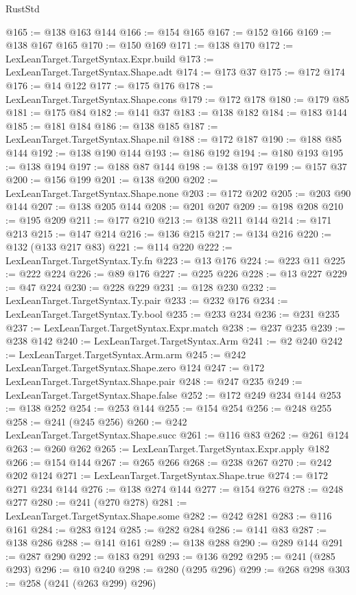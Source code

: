 \begin{lexlean}{RustStd}
\begin{coremodule}
@165 := @138 @163 @144
@166 := @154 @165
@167 := @152 @166
@169 := @138 @167 @165
@170 := @150 @169
@171 := @138 @170
@172 := LexLeanTarget.TargetSyntax.Expr.build
@173 := LexLeanTarget.TargetSyntax.Shape.adt
@174 := @173 @37
@175 := @172 @174
@176 := @14 @122
@177 := @175 @176
@178 := LexLeanTarget.TargetSyntax.Shape.cons
@179 := @172 @178
@180 := @179 @85
@181 := @175 @84
@182 := @141 @37
@183 := @138 @182
@184 := @183 @144
@185 := @181 @184
@186 := @138 @185
@187 := LexLeanTarget.TargetSyntax.Shape.nil
@188 := @172 @187
@190 := @188 @85 @144
@192 := @138 @190 @144
@193 := @186 @192
@194 := @180 @193
@195 := @138 @194
@197 := @188 @87 @144
@198 := @138 @197
@199 := @157 @37
@200 := @156 @199
@201 := @138 @200
@202 := LexLeanTarget.TargetSyntax.Shape.none
@203 := @172 @202
@205 := @203 @90 @144
@207 := @138 @205 @144
@208 := @201 @207
@209 := @198 @208
@210 := @195 @209
@211 := @177 @210
@213 := @138 @211 @144
@214 := @171 @213
@215 := @147 @214
@216 := @136 @215
@217 := @134 @216
@220 := @132 (@133 @217 @83)
@221 := @114 @220
@222 := LexLeanTarget.TargetSyntax.Ty.fn
@223 := @13 @176
@224 := @223 @11
@225 := @222 @224
@226 := @89 @176
@227 := @225 @226
@228 := @13 @227
@229 := @47 @224
@230 := @228 @229
@231 := @128 @230
@232 := LexLeanTarget.TargetSyntax.Ty.pair
@233 := @232 @176
@234 := LexLeanTarget.TargetSyntax.Ty.bool
@235 := @233 @234
@236 := @231 @235
@237 := LexLeanTarget.TargetSyntax.Expr.match
@238 := @237 @235
@239 := @238 @142
@240 := LexLeanTarget.TargetSyntax.Arm
@241 := @2 @240
@242 := LexLeanTarget.TargetSyntax.Arm.arm
@245 := @242 LexLeanTarget.TargetSyntax.Shape.zero @124
@247 := @172 LexLeanTarget.TargetSyntax.Shape.pair
@248 := @247 @235
@249 := LexLeanTarget.TargetSyntax.Shape.false
@252 := @172 @249 @234 @144
@253 := @138 @252
@254 := @253 @144
@255 := @154 @254
@256 := @248 @255
@258 := @241 (@245 @256)
@260 := @242 LexLeanTarget.TargetSyntax.Shape.succ
@261 := @116 @83
@262 := @261 @124
@263 := @260 @262
@265 := LexLeanTarget.TargetSyntax.Expr.apply @182
@266 := @154 @144
@267 := @265 @266
@268 := @238 @267
@270 := @242 @202 @124
@271 := LexLeanTarget.TargetSyntax.Shape.true
@274 := @172 @271 @234 @144
@276 := @138 @274 @144
@277 := @154 @276
@278 := @248 @277
@280 := @241 (@270 @278)
@281 := LexLeanTarget.TargetSyntax.Shape.some
@282 := @242 @281
@283 := @116 @161
@284 := @283 @124
@285 := @282 @284
@286 := @141 @83
@287 := @138 @286
@288 := @141 @161
@289 := @138 @288
@290 := @289 @144
@291 := @287 @290
@292 := @183 @291
@293 := @136 @292
@295 := @241 (@285 @293)
@296 := @10 @240
@298 := @280 (@295 @296)
@299 := @268 @298
@303 := @258 (@241 (@263 @299) @296)

\end{coremodule}
\end{lexlean}
